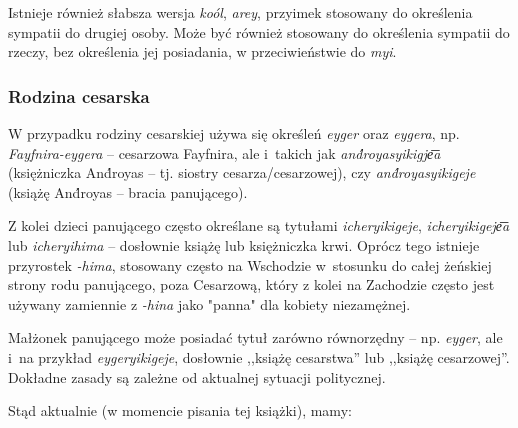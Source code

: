 \begin{spacing}{1.1}
Istnieje również słabsza wersja \emph{koól}, \emph{arey}, przyimek stosowany do
określenia sympatii do drugiej osoby. Może być również stosowany do określenia
sympatii do rzeczy, bez określenia jej posiadania, w przeciwieństwie do
\emph{myi}.

\subsubsection{Rodzina cesarska}

W przypadku rodziny cesarskiej używa się określeń \emph{eyger} oraz
\emph{eygera}, np. \emph{Fayfnira-eygera} -- cesarzowa Fayfnira, ale i~takich
jak \emph{and́royasyikigje͞a} (księżniczka And́royas -- tj. siostry
cesarza/cesarzowej), czy \emph{and́royasyikigeje} (książę And́royas -- bracia
panującego).

Z kolei dzieci panującego często określane są tytułami \emph{icheryikigeje},
\emph{icheryikigeje͞a} lub \emph{icheryihima} -- dosłownie książę lub
księżniczka krwi. Oprócz tego istnieje przyrostek \emph{-hima}, stosowany często
na Wschodzie w~stosunku do całej żeńskiej strony rodu panującego, poza
Cesarzową, który z kolei na Zachodzie często jest używany zamiennie z
\emph{-hina} jako "panna" dla kobiety niezamężnej.

Małżonek panującego może posiadać tytuł zarówno równorzędny -- np. \emph{eyger},
ale i~na przykład \emph{eygeryikigeje}, dosłownie ,,książę cesarstwa'' lub
,,książę cesarzowej''. Dokładne zasady są zależne od aktualnej sytuacji
politycznej.

Stąd aktualnie (w momencie pisania tej książki), mamy:


\end{spacing}

